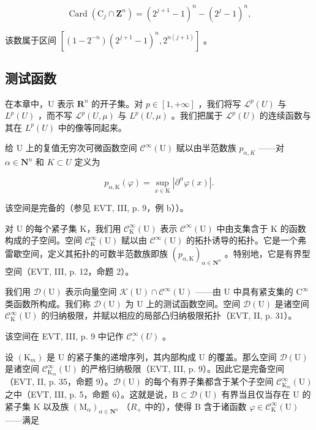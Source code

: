 \[
\operatorname{Card} \left(\mathrm{C} _ {j} \cap \mathbf {Z} ^ {n}\right) = (2 ^ {j + 1} - 1) ^ {n} - (2 ^ {j} - 1) ^ {n},
\]

该数属于区间 \([(1-2^{-n})(2^{j+1}-1)^{n},2^{n(j+1)}]\) 。

\subsection{测试函数}

在本章中，U 表示 \(\mathbf{R}^{n}\) 的开子集。对 \(p \in [1, +\infty]\) ，我们将写 \(\mathcal{L}^{p}(U)\) 与 \(L^{p}(U)\) ，而不写 \(\mathcal{L}^{p}(U, \mu)\) 与 \(L^{p}(U, \mu)\) 。我们把属于 \(\mathcal{L}^{p}(U)\) 的连续函数与其在 \(L^{p}(U)\) 中的像等同起来。

给 U 上的复值无穷次可微函数空间 \(\mathcal{C}^{\infty}(\mathrm{U})\) 赋以由半范数族 \(p_{\alpha,K}\) ——对 \(\alpha \in \mathbf{N}^{n}\) 和 \(K \subset U\) 定义为

\[
p _ {\alpha , \mathrm{K}} (\varphi) = \sup _ {x \in \mathrm{K}} | \partial^ {\alpha} \varphi (x) |.
\]

该空间是完备的（参见 EVT, III, p. 9，例 b））。

对 U 的每个紧子集 K，我们用 \(\mathcal{C}_{\mathrm{K}}^{\infty}(\mathrm{U})\) 表示 \(\mathcal{C}^{\infty}(\mathrm{U})\) 中由支集含于 K 的函数构成的子空间。空间 \(\mathcal{C}_{\mathrm{K}}^{\infty}(\mathrm{U})\) 赋以由 \(\mathcal{C}^{\infty}(\mathrm{U})\) 的拓扑诱导的拓扑。它是一个弗雷歇空间，定义其拓扑的可数半范数族即族 \((p_{\alpha,\mathrm{K}})_{\alpha\in\mathbf{N}^{n}}\) 。特别地，它是有界型空间（EVT, III, p. 12，命题 2）。

我们用 \(\mathcal{D}(\mathrm{U})\) 表示向量空间 \(\mathcal{K}(\mathrm{U})\cap \mathcal{C}^{\infty}(\mathrm{U})\) ——由 U 中具有紧支集的 \(\mathrm{C}^{\infty}\) 类函数所构成。我们称 \(\mathcal{D}(\mathrm{U})\) 为 U 上的测试函数空间。空间 \(\mathcal{D}(\mathrm{U})\) 是诸空间 \(\mathcal{C}_{\mathrm{K}}^{\infty}(\mathrm{U})\) 的归纳极限，并赋以相应的局部凸归纳极限拓扑（EVT, II, p. 31）。

该空间在 EVT, III, p. 9 中记作 \(\mathcal{C}_{\circ}^{\infty}(U)\) 。

设 \((\mathrm{K}_{m})\) 是 U 的紧子集的递增序列，其内部构成 U 的覆盖。那么空间 \(\mathcal{D}(\mathrm{U})\) 是诸空间 \(\mathcal{C}_{\mathrm{K}_{m}}^{\infty}(\mathrm{U})\) 的严格归纳极限（EVT, III, p. 9）。因此它是完备空间（EVT, II, p. 35，命题 9）。\(\mathcal{D}(\mathrm{U})\) 的每个有界子集都含于某个子空间 \(\mathcal{C}_{\mathrm{K}_{m}}^{\infty}(\mathrm{U})\) 之中（EVT, III, p. 5，命题 6）。这就是说，\(\mathrm{B}\subset\mathcal{D}(\mathrm{U})\) 有界当且仅当存在 U 的紧子集 K 以及族 \((\mathrm{M}_{\alpha})_{\alpha\in\mathbf{N}^{n}}\) （\(R_{+}\) 中的），使得 B 含于诸函数 \(\varphi\in\mathcal{C}_{\mathrm{K}}^{\infty}(\mathrm{U})\) ——满足

